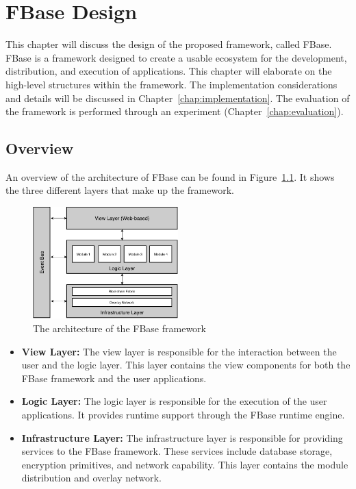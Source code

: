 \chapter{\label{chap:design}FBase Design}

This chapter will discuss the design of the proposed framework, called FBase. FBase is a framework designed to create a usable ecosystem for the development, distribution, and execution of applications. This chapter will elaborate on the high-level structures within the framework. The implementation considerations and details will be discussed in Chapter~\ref{chap:implementation}. The evaluation of the framework is performed through an experiment (Chapter~\ref{chap:evaluation}).

\section{Overview}

An overview of the architecture of FBase can be found in Figure~\ref{fig:architecture}. It shows the three different layers that make up the framework.

\begin{figure}[h]
	\centering
	\includegraphics[width=0.5\textwidth]{images/architecture.pdf}
	\caption{\label{fig:architecture} The architecture of the FBase framework}
\end{figure}

\begin{itemize}
	\item \textbf{View Layer:}
	The view layer is responsible for the interaction between the user and the logic layer. This layer contains the view components for both the FBase framework and the user applications.
	
	\item \textbf{Logic Layer:} The logic layer is responsible for the execution of the user applications. It provides runtime support through the FBase runtime engine.
	
	\item \textbf{Infrastructure Layer:} The infrastructure layer is responsible for providing services to the FBase framework. These services include database storage, encryption primitives, and network capability. This layer contains the module distribution and overlay network.
\end{itemize}

